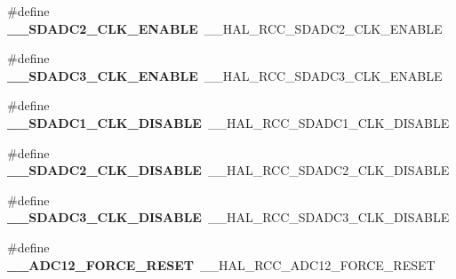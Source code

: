\begin{DoxyCompactItemize}
\item 
\hypertarget{group___h_a_l___r_c_c___aliased_ga16ecec4c60d069b7d6c99aefc8956d79}{\#define {\bfseries \-\_\-\-\_\-\-S\-D\-A\-D\-C2\-\_\-\-C\-L\-K\-\_\-\-E\-N\-A\-B\-L\-E}~\-\_\-\-\_\-\-H\-A\-L\-\_\-\-R\-C\-C\-\_\-\-S\-D\-A\-D\-C2\-\_\-\-C\-L\-K\-\_\-\-E\-N\-A\-B\-L\-E}\label{group___h_a_l___r_c_c___aliased_ga16ecec4c60d069b7d6c99aefc8956d79}

\item 
\hypertarget{group___h_a_l___r_c_c___aliased_ga50aefed27799abc72d6b30099a764208}{\#define {\bfseries \-\_\-\-\_\-\-S\-D\-A\-D\-C3\-\_\-\-C\-L\-K\-\_\-\-E\-N\-A\-B\-L\-E}~\-\_\-\-\_\-\-H\-A\-L\-\_\-\-R\-C\-C\-\_\-\-S\-D\-A\-D\-C3\-\_\-\-C\-L\-K\-\_\-\-E\-N\-A\-B\-L\-E}\label{group___h_a_l___r_c_c___aliased_ga50aefed27799abc72d6b30099a764208}

\item 
\hypertarget{group___h_a_l___r_c_c___aliased_ga7bee6f236c8a299f3b751b46612348a5}{\#define {\bfseries \-\_\-\-\_\-\-S\-D\-A\-D\-C1\-\_\-\-C\-L\-K\-\_\-\-D\-I\-S\-A\-B\-L\-E}~\-\_\-\-\_\-\-H\-A\-L\-\_\-\-R\-C\-C\-\_\-\-S\-D\-A\-D\-C1\-\_\-\-C\-L\-K\-\_\-\-D\-I\-S\-A\-B\-L\-E}\label{group___h_a_l___r_c_c___aliased_ga7bee6f236c8a299f3b751b46612348a5}

\item 
\hypertarget{group___h_a_l___r_c_c___aliased_ga99088247c1f6d91fbc4423f589139445}{\#define {\bfseries \-\_\-\-\_\-\-S\-D\-A\-D\-C2\-\_\-\-C\-L\-K\-\_\-\-D\-I\-S\-A\-B\-L\-E}~\-\_\-\-\_\-\-H\-A\-L\-\_\-\-R\-C\-C\-\_\-\-S\-D\-A\-D\-C2\-\_\-\-C\-L\-K\-\_\-\-D\-I\-S\-A\-B\-L\-E}\label{group___h_a_l___r_c_c___aliased_ga99088247c1f6d91fbc4423f589139445}

\item 
\hypertarget{group___h_a_l___r_c_c___aliased_ga42ec4cf1c87cbddc3b2298baedddba7b}{\#define {\bfseries \-\_\-\-\_\-\-S\-D\-A\-D\-C3\-\_\-\-C\-L\-K\-\_\-\-D\-I\-S\-A\-B\-L\-E}~\-\_\-\-\_\-\-H\-A\-L\-\_\-\-R\-C\-C\-\_\-\-S\-D\-A\-D\-C3\-\_\-\-C\-L\-K\-\_\-\-D\-I\-S\-A\-B\-L\-E}\label{group___h_a_l___r_c_c___aliased_ga42ec4cf1c87cbddc3b2298baedddba7b}

\item 
\hypertarget{group___h_a_l___r_c_c___aliased_gacbc2844f7655815ba4ae65f4ca715dbb}{\#define {\bfseries \-\_\-\-\_\-\-A\-D\-C12\-\_\-\-F\-O\-R\-C\-E\-\_\-\-R\-E\-S\-E\-T}~\-\_\-\-\_\-\-H\-A\-L\-\_\-\-R\-C\-C\-\_\-\-A\-D\-C12\-\_\-\-F\-O\-R\-C\-E\-\_\-\-R\-E\-S\-E\-T}\label{group___h_a_l___r_c_c___aliased_gacbc2844f7655815ba4ae65f4ca715dbb}


\end{DoxyCompactItemize}
